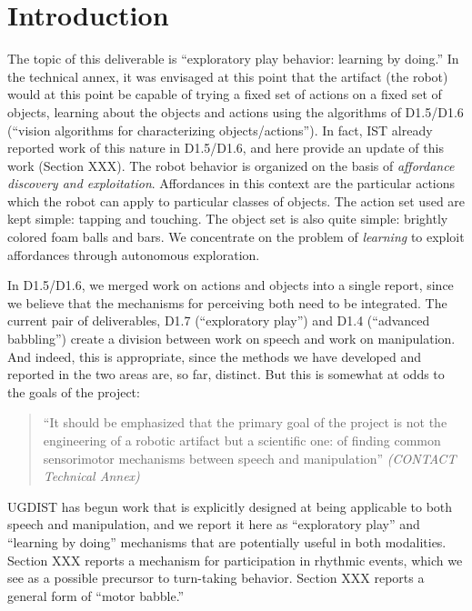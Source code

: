 
\section{Introduction}

The topic of this deliverable is ``exploratory play behavior: learning
by doing.''  In the technical annex, it was envisaged at this point that
the artifact (the robot) would at this point be capable of trying a fixed
set of actions on a fixed set of objects, learning about the objects
and actions using the algorithms of D1.5/D1.6 (``vision algorithms for characterizing objects/actions'').
%
In fact, IST already reported work of this nature in D1.5/D1.6, 
and here provide an update of this work (Section XXX).
%
The robot behavior is organized on the basis of {\em affordance
discovery and exploitation}.  Affordances in this context are the
particular actions which the robot can apply to particular classes
of objects.  The action set used are kept simple: tapping and touching.
The object set is also quite simple: brightly colored foam balls and
bars.  We concentrate on the problem of {\em learning} to exploit 
affordances through autonomous exploration.

In D1.5/D1.6, we merged work on actions and objects into a single
report, since we believe that the mechanisms for perceiving both
need to be integrated.  The current pair of deliverables,
D1.7 (``exploratory play'') and D1.4 (``advanced babbling'')
create a division between work on speech and work on manipulation.
And indeed, this is appropriate, since the methods we have
developed and reported in the two areas are, so far, distinct.
But this is somewhat at odds to the goals of the project:

\begin{quote}

``It should be emphasized that the primary goal of the project is not
the engineering of a robotic artifact but a scientific one: of finding
common sensorimotor mechanisms between speech and manipulation''
{\it (CONTACT Technical Annex)}

\end{quote}

UGDIST has begun work that is explicitly designed at being applicable
to both speech and manipulation, and we report it here as
``exploratory play'' and ``learning by doing'' mechanisms that
are potentially useful in both modalities.  Section XXX reports
a mechanism for participation in rhythmic events, which we see
as a possible precursor to turn-taking behavior.  Section XXX
reports a general form of ``motor babble.''



